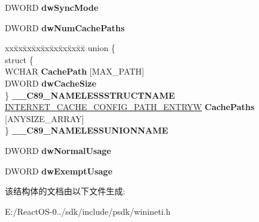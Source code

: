 \begin{DoxyCompactItemize}
D\+W\+O\+RD {\bfseries dw\+Sync\+Mode}
\item 
\mbox{\label{struct___i_n_t_e_r_n_e_t___c_a_c_h_e___c_o_n_f_i_g___i_n_f_o_w_a0cddc82ee82b995e52ec893d43462d01}} 
D\+W\+O\+RD {\bfseries dw\+Num\+Cache\+Paths}
\item 
\mbox{\label{struct___i_n_t_e_r_n_e_t___c_a_c_h_e___c_o_n_f_i_g___i_n_f_o_w_a2298563b0a2bd847abef616f764dcc57}} 
\begin{tabbing}
xx\=xx\=xx\=xx\=xx\=xx\=xx\=xx\=xx\=\kill
union \{\\
\>struct \{\\
\>\>WCHAR {\bfseries CachePath} \mbox{[}MAX\_PATH\mbox{]}\\
\>\>DWORD {\bfseries dwCacheSize}\\
\>\} {\bfseries \_\_C89\_NAMELESSSTRUCTNAME}\\
\>\hyperlink{struct___i_n_t_e_r_n_e_t___c_a_c_h_e___c_o_n_f_i_g___p_a_t_h___e_n_t_r_y_w}{INTERNET\_CACHE\_CONFIG\_PATH\_ENTRYW} {\bfseries CachePaths} \mbox{[}ANYSIZE\_ARRAY\mbox{]}\\
\} {\bfseries \_\_C89\_NAMELESSUNIONNAME}\\

\end{tabbing}\item 
\mbox{\label{struct___i_n_t_e_r_n_e_t___c_a_c_h_e___c_o_n_f_i_g___i_n_f_o_w_a53f4dcee43e155c0d54c70299c117532}} 
D\+W\+O\+RD {\bfseries dw\+Normal\+Usage}
\item 
\mbox{\label{struct___i_n_t_e_r_n_e_t___c_a_c_h_e___c_o_n_f_i_g___i_n_f_o_w_a04641fd0121d1a6c45f2d27998f1a75e}} 
D\+W\+O\+RD {\bfseries dw\+Exempt\+Usage}
\end{DoxyCompactItemize}


该结构体的文档由以下文件生成\+:\begin{DoxyCompactItemize}
\item 
E\+:/\+React\+O\+S-\/0../sdk/include/psdk/winineti.\+h\end{DoxyCompactItemize}
